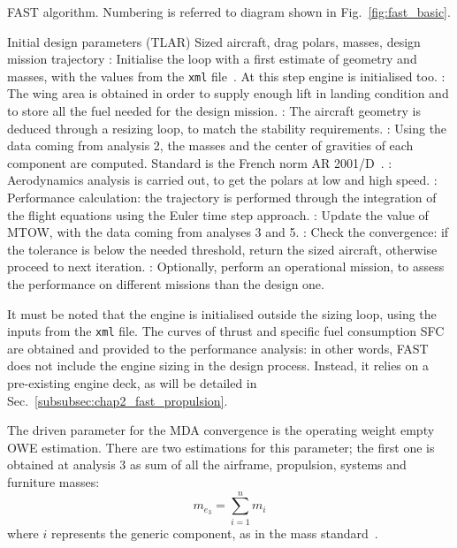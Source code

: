 \begin{algorithm}[!h]
	\caption{FAST algorithm. Numbering is referred to diagram shown in Fig.~\ref{fig:fast_basic}.}
	\label{alg:fast_basic}
	\begin{algorithmic}
		\REQUIRE Initial design parameters (TLAR)
		\ENSURE Sized aircraft, drag polars, masses, design mission trajectory
		: Initialise the loop with a first estimate of geometry and masses, with the values from the \texttt{xml} file~\cite{bib:airbus_notes}. At this step engine is initialised too.
		\REPEAT
		: The wing area is obtained in order to supply enough lift in landing condition and to store all the fuel needed for the design mission.
		: The aircraft geometry is deduced through a resizing loop, to match the stability requirements.
		: Using the data coming from analysis 2, the masses and the center of gravities of each component are computed. Standard is the French norm AR 2001/D~\cite{bib:mass_breakdown}.
		: Aerodynamics analysis is carried out, to get the polars at low and high speed.
		: Performance calculation: the trajectory is performed through the integration of the flight equations using the Euler time step approach.
		: Update the value of MTOW, with the data coming from analyses 3 and 5.
		: Check the convergence: if the tolerance is below the needed threshold, return the sized aircraft, otherwise proceed to next iteration.
		: Optionally, perform an operational mission, to assess the performance on different missions than the design one.
	\end{algorithmic}
\end{algorithm}

It must be noted that the engine is initialised outside the sizing loop, using the inputs from the \texttt{xml} file. 
The curves of thrust and specific fuel consumption SFC are obtained and provided to the performance analysis: in other words, FAST does not include the engine sizing in the design process.
Instead, it relies on a pre-existing engine deck, as will be detailed in Sec.~\ref{subsubsec:chap2_fast_propulsion}. 

The driven parameter for the MDA convergence is the operating weight empty OWE estimation.
There are two estimations for this parameter; the first one is obtained at analysis 3 as sum of all the airframe, propulsion, systems and furniture masses:
\begin{equation}
\label{eq:owe_struct}
m_{e_{3}} = \sum_{i=1}^{n}m_i
\end{equation}
where $i$ represents the generic component, as in the mass standard~\cite{bib:mass_breakdown}.

